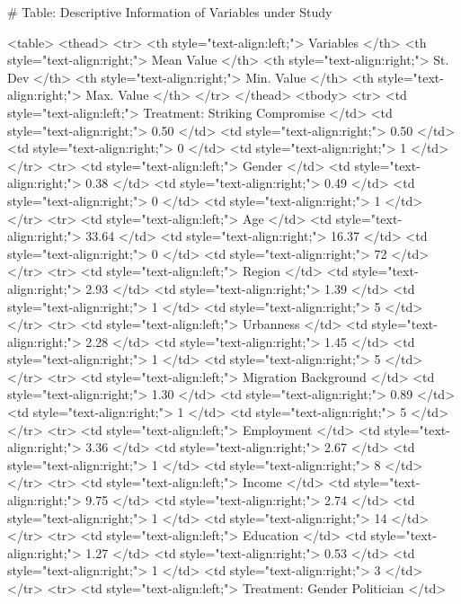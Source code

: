 # Table: Descriptive Information of Variables under Study 

<table>
 <thead>
  <tr>
   <th style="text-align:left;"> Variables </th>
   <th style="text-align:right;"> Mean Value </th>
   <th style="text-align:right;"> St. Dev </th>
   <th style="text-align:right;"> Min. Value </th>
   <th style="text-align:right;"> Max. Value </th>
  </tr>
 </thead>
<tbody>
  <tr>
   <td style="text-align:left;"> Treatment: Striking Compromise </td>
   <td style="text-align:right;"> 0.50 </td>
   <td style="text-align:right;"> 0.50 </td>
   <td style="text-align:right;"> 0 </td>
   <td style="text-align:right;"> 1 </td>
  </tr>
  <tr>
   <td style="text-align:left;"> Gender </td>
   <td style="text-align:right;"> 0.38 </td>
   <td style="text-align:right;"> 0.49 </td>
   <td style="text-align:right;"> 0 </td>
   <td style="text-align:right;"> 1 </td>
  </tr>
  <tr>
   <td style="text-align:left;"> Age </td>
   <td style="text-align:right;"> 33.64 </td>
   <td style="text-align:right;"> 16.37 </td>
   <td style="text-align:right;"> 0 </td>
   <td style="text-align:right;"> 72 </td>
  </tr>
  <tr>
   <td style="text-align:left;"> Region </td>
   <td style="text-align:right;"> 2.93 </td>
   <td style="text-align:right;"> 1.39 </td>
   <td style="text-align:right;"> 1 </td>
   <td style="text-align:right;"> 5 </td>
  </tr>
  <tr>
   <td style="text-align:left;"> Urbanness </td>
   <td style="text-align:right;"> 2.28 </td>
   <td style="text-align:right;"> 1.45 </td>
   <td style="text-align:right;"> 1 </td>
   <td style="text-align:right;"> 5 </td>
  </tr>
  <tr>
   <td style="text-align:left;"> Migration Background </td>
   <td style="text-align:right;"> 1.30 </td>
   <td style="text-align:right;"> 0.89 </td>
   <td style="text-align:right;"> 1 </td>
   <td style="text-align:right;"> 5 </td>
  </tr>
  <tr>
   <td style="text-align:left;"> Employment </td>
   <td style="text-align:right;"> 3.36 </td>
   <td style="text-align:right;"> 2.67 </td>
   <td style="text-align:right;"> 1 </td>
   <td style="text-align:right;"> 8 </td>
  </tr>
  <tr>
   <td style="text-align:left;"> Income </td>
   <td style="text-align:right;"> 9.75 </td>
   <td style="text-align:right;"> 2.74 </td>
   <td style="text-align:right;"> 1 </td>
   <td style="text-align:right;"> 14 </td>
  </tr>
  <tr>
   <td style="text-align:left;"> Education </td>
   <td style="text-align:right;"> 1.27 </td>
   <td style="text-align:right;"> 0.53 </td>
   <td style="text-align:right;"> 1 </td>
   <td style="text-align:right;"> 3 </td>
  </tr>
  <tr>
   <td style="text-align:left;"> Treatment: Gender Politician </td>
